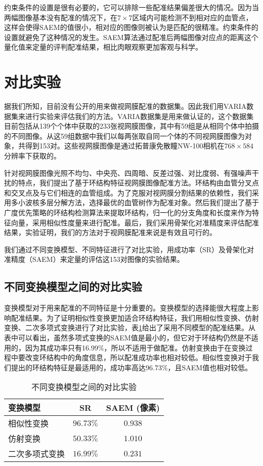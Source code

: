 约束条件的设置是很有必要的，它可以排除一些配准结果偏差很大的情况。因为当两幅图像基本没有配准的情况下，在$7 \times 7$区域内可能检测不到相对应的血管点，这样会使得SAEM的值很小，相对应的图像则被认为是匹配的很精准。约束条件的设置就避免了这种情况的发生。SAEM算法通过配准后两幅图像对应点的距离这个量化值来定量的评判配准结果，相比肉眼观察更加客观与科学。
\section{对比实验}
\label{}
据我们所知，目前没有公开的用来做视网膜配准的数据集。因此我们用VARIA数据集\cite{ortega2009retinal,ortega2009personal}来进行实验来评估我们的方法。VARIA数据集是用来做认证的，这个数据集目前包括从139个个体中获取的233张视网膜图像，其中有59组是从相同个体中拍摄的不同图像。从这59组数据中我们以每两张取自同一个体的不同视网膜图像为对象，共得到153对。这些视网膜图像是通过拓普康免散瞳NW-100相机在$768 \times 584$分辨率下获取的。

针对视网膜图像光照不均匀、中央亮、四周暗、反差过强、对比度弱、有强噪声干扰的特点，我们提出了基于环结构特征视网膜图像配准方法。环结构由血管分叉点和交叉点及与它们相连的血管组成。为了克服对视网膜分割结果的依赖性，我们采用多小波核多层分解方法，选择最优的血管树作为配准对象。然后我们提出了基于广度优先策略的环结构检测算法来提取环结构，归一化的分支角度和长度来作为特征向量，采用相似性度量来进行配准。最后，我们采用骨架化对准精度来评估配准结果，实验证明，我们的方法对于视网膜配准来说是有效且可行的。

我们通过不同变换模型、不同特征进行了对比实验，用成功率（SR）及骨架化对准精度（SAEM）来定量的评估这153对图像的实验结果。

\subsection{不同变换模型之间的对比实验}

变换模型对于用来配准的不同特征是十分重要的。变换模型的选择能很大程度上影响配准结果。为了证明相似性变换更加适合环结构特征，我们用相似性变换、仿射变换、二次多项式变换进行了对比实验，表\ref{tab:models}给出了采用不同模型的配准结果。从表中可以看出，虽然多项式变换的SAEM值是最小的，但它对于环结构仍然是不适用的，因为其成功率只有16.99\%，所以不适用于做配准。仿射变换由于在变换过程中要改变环结构中的角度信息，所以配准成功率也相对较低。相似性变换对于我们提出的环结构特征是最适用的，成功率高达96.73\%，且SAEM值也相对较低。
\begin{table}
\caption{不同变换模型之间的对比实验}
\centering
\begin{tabular}{lcc}
\toprule
变换模型 & SR  & SAEM (像素)\\
\midrule
相似性变换 & $\mathbf{96.73\%}$ & $\mathbf{0.938}$ \\
仿射变换 & $50.33\%$ & $1.010$              \\
二次多项式变换 & $16.99\%$ & $0.231$\\
\bottomrule
\end{tabular}
\label{tab:models}
\end{table}

